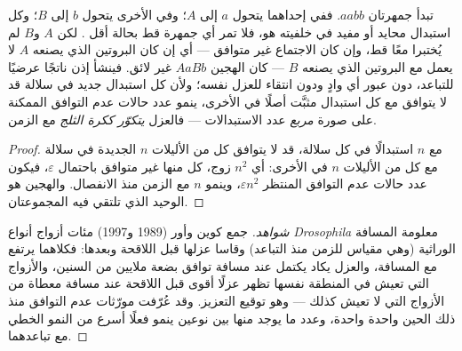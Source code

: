 \begin{theorem}\label{thm:b2:speciation:dm}
تبدأ جمهرتان  $aabb$. ففي إحداهما يتحول $a$
إلى $A$؛ وفي الأخرى يتحول $b$ إلى $B$؛ وكل استبدال محايد أو
مفيد في خلفيته هو، فلا تمر أي جمهرة قط
بحالة أقل . لكن $A$ و$B$ لم يُختبرا معًا
قط، وإن كان الاجتماع غير متوافق --- أي إن كان البروتين
الذي يصنعه $A$ لا يعمل مع البروتين الذي يصنعه $B$ --- كان
الهجين $AaBb$ غير لائق. فينشأ  إذن ناتجًا
عرضيًا للتباعد، دون عبور أي وادٍ ودون انتقاء
للعزل نفسه؛ ولأن كل استبدال جديد في سلالة
قد لا يتوافق مع كل استبدال مثبَّت أصلًا
في الأخرى، ينمو عدد حالات عدم التوافق الممكنة على صورة \emph{مربع}
عدد الاستبدالات --- فالعزل \emph{يتكوّر ككرة الثلج}
مع الزمن.
\end{theorem}
\begin{proof}
مع $n$ استبدالًا في كل سلالة، قد لا يتوافق كل من الأليلات $n$
الجديدة في سلالة مع كل من الأليلات $n$ في
الأخرى: أي $n^{2}$ زوج، كل منها غير متوافق باحتمال
$\varepsilon$، فيكون عدد حالات عدم التوافق المنتظر
$\varepsilon n^{2}$، وينمو $n$ مع الزمن منذ الانفصال.
والهجين هو  الوحيد الذي تلتقي فيه المجموعتان.
\end{proof}
\begin{proof}[شواهد]
جمع كوين وأور (1989 و1997) مئات أزواج أنواع
\emph{Drosophila} معلومة المسافة الوراثية (وهي مقياس
للزمن منذ التباعد) وقاسا عزلها قبل اللاقحة
وبعدها: فكلاهما يرتفع مع المسافة، والعزل
يكاد يكتمل عند مسافة توافق بضعة ملايين من
السنين، والأزواج التي تعيش في المنطقة نفسها تظهر عزلًا
أقوى قبل اللاقحة عند مسافة معطاة من الأزواج التي لا تعيش كذلك ---
وهو توقيع التعزيز. وقد عُرّفت مورّثات عدم التوافق منذ ذلك الحين
واحدة واحدة، وعدد ما يوجد منها بين نوعين
ينمو فعلًا أسرع من النمو الخطي مع تباعدهما.
\end{proof}

